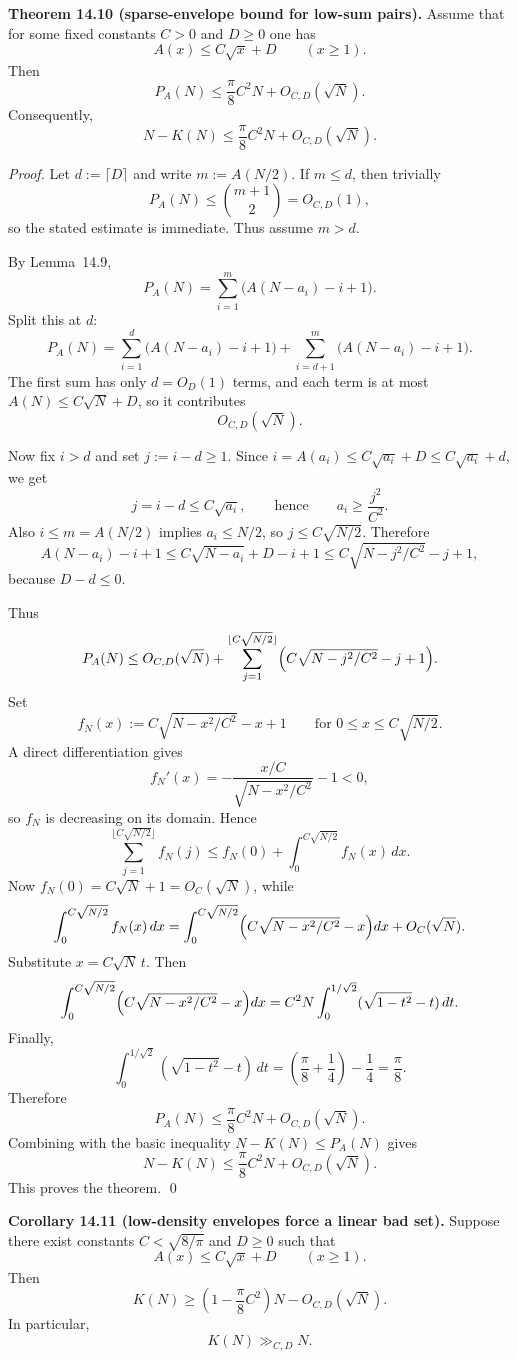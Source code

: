 \medskip

\noindent\textbf{Theorem 14.10 (sparse-envelope bound for low-sum pairs).}
Assume that for some fixed constants $C>0$ and $D\ge 0$ one has
\[
A(x)\le C\sqrt{x}+D
\qquad (x\ge 1).
\]
Then
\[
P_A(N)\le \frac{\pi}{8}C^2N+O_{C,D}(\sqrt N).
\]
Consequently,
\[
N-K(N)\le \frac{\pi}{8}C^2N+O_{C,D}(\sqrt N).
\]

\noindent\textit{Proof.}
Let $d:=\lceil D\rceil$ and write $m:=A(N/2)$. If $m\le d$, then trivially
\[
P_A(N)\le \binom{m+1}{2}=O_{C,D}(1),
\]
so the stated estimate is immediate. Thus assume $m>d$.

By Lemma~14.9,
\[
P_A(N)=\sum_{i=1}^{m}\bigl(A(N-a_i)-i+1\bigr).
\]
Split this at $d$:
\[
P_A(N)=\sum_{i=1}^{d}\bigl(A(N-a_i)-i+1\bigr)
+\sum_{i=d+1}^{m}\bigl(A(N-a_i)-i+1\bigr).
\]
The first sum has only $d=O_D(1)$ terms, and each term is at most $A(N)\le C\sqrt N+D$, so it contributes
\[
O_{C,D}(\sqrt N).
\]

Now fix $i>d$ and set $j:=i-d\ge 1$. Since $i=A(a_i)\le C\sqrt{a_i}+D\le C\sqrt{a_i}+d$, we get
\[
j=i-d\le C\sqrt{a_i},
\qquad\mbox{hence}\qquad
a_i\ge \frac{j^2}{C^2}.
\]
Also $i\le m=A(N/2)$ implies $a_i\le N/2$, so $j\le C\sqrt{N/2}$. Therefore
\[
A(N-a_i)-i+1
\le C\sqrt{N-a_i}+D-i+1
\le C\sqrt{N-j^2/C^2}-j+1,
\]
because $D-d\le 0$.

Thus
\[
P_A(N)
\le O_{C,D}(\sqrt N)
+\sum_{j=1}^{\lfloor C\sqrt{N/2}\rfloor}
\Bigl(C\sqrt{N-j^2/C^2}-j+1\Bigr).
\]
Set
\[
f_N(x):=C\sqrt{N-x^2/C^2}-x+1
\qquad\mbox{for }0\le x\le C\sqrt{N/2}.
\]
A direct differentiation gives
\[
f_N'(x)=-\frac{x/C}{\sqrt{N-x^2/C^2}}-1<0,
\]
so $f_N$ is decreasing on its domain. Hence
\[
\sum_{j=1}^{\lfloor C\sqrt{N/2}\rfloor} f_N(j)
\le f_N(0)+\int_0^{C\sqrt{N/2}} f_N(x)\,dx.
\]
Now $f_N(0)=C\sqrt N+1=O_C(\sqrt N)$, while
\[
\int_0^{C\sqrt{N/2}} f_N(x)\,dx
=
\int_0^{C\sqrt{N/2}}\Bigl(C\sqrt{N-x^2/C^2}-x\Bigr)dx
+O_C(\sqrt N).
\]
Substitute $x=C\sqrt N\,t$. Then
\[
\int_0^{C\sqrt{N/2}}\Bigl(C\sqrt{N-x^2/C^2}-x\Bigr)dx
=
C^2N\int_0^{1/\sqrt2}(\sqrt{1-t^2}-t)\,dt.
\]
Finally,
\[
\int_0^{1/\sqrt2}(\sqrt{1-t^2}-t)\,dt
=
\left(\frac{\pi}{8}+\frac14\right)-\frac14
=\frac{\pi}{8}.
\]
Therefore
\[
P_A(N)\le \frac{\pi}{8}C^2N+O_{C,D}(\sqrt N).
\]
Combining with the basic inequality $N-K(N)\le P_A(N)$ gives
\[
N-K(N)\le \frac{\pi}{8}C^2N+O_{C,D}(\sqrt N).
\]
This proves the theorem. \qed

\medskip

\noindent\textbf{Corollary 14.11 (low-density envelopes force a linear bad set).}
Suppose there exist constants $C<\sqrt{8/\pi}$ and $D\ge 0$ such that
\[
A(x)\le C\sqrt{x}+D
\qquad (x\ge 1).
\]
Then
\[
K(N)\ge \left(1-\frac{\pi}{8}C^2\right)N-O_{C,D}(\sqrt N).
\]
In particular,
\[
K(N)\gg_{C,D} N.
\]

